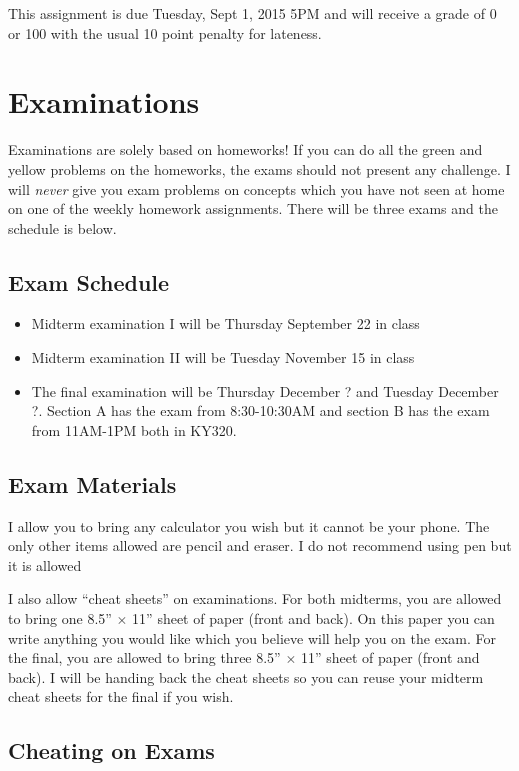 \documentclass[12pt]{article}
\newcommand{\qu}[1]{``#1''}
\begin{document}
This assignment is due Tuesday, Sept 1, 2015 5PM and will receive a grade of 0 or 100 with the usual 10 point penalty for lateness.


\section*{Examinations}

Examinations are solely based on homeworks! If you can do all the green and yellow problems on the homeworks, the exams should not present any challenge. I will \textit{never} give you exam problems on concepts which you have not seen at home on one of the weekly homework assignments. There will be three exams and the schedule is below.

\subsection*{Exam Schedule}\label{subsec:exam_schedule}

\begin{itemize}
\itemsep -0.0em 
\item Midterm examination I will be Thursday September 22 in class
\item Midterm examination II will be Tuesday November 15 in class
\item The final examination will be Thursday December ? and Tuesday December ?. Section A has the exam from 8:30-10:30AM and section B has the exam from 11AM-1PM both in KY320.
\end{itemize}

\subsection*{Exam Materials}

I allow you to bring any calculator you wish but it cannot be your phone. The only other items allowed are pencil and eraser. I do not recommend using pen but it is allowed

I also allow \qu{cheat sheets} on examinations. For both midterms, you are allowed to bring one 8.5'' $\times$ 11'' sheet of paper (front and back). On this paper you can write anything you would like which you believe will help you on the exam. For the final, you are allowed to bring three 8.5'' $\times$ 11'' sheet of paper (front and back). I will be handing back the cheat sheets so you can reuse your midterm cheat sheets for the final if you wish. 


\subsection*{Cheating on Exams}
\end{document}

